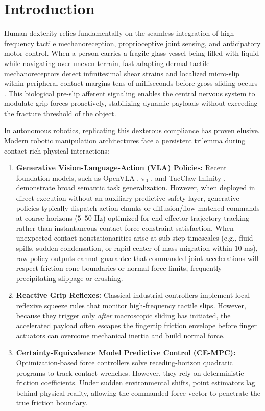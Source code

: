 \section{Introduction}
\label{sec:introduction}

Human dexterity relies fundamentally on the seamless integration of high-frequency tactile mechanoreception, proprioceptive joint sensing, and anticipatory motor control. When a person carries a fragile glass vessel being filled with liquid while navigating over uneven terrain, fast-adapting dermal tactile mechanoreceptors detect infinitesimal shear strains and localized micro-slip within peripheral contact margins tens of milliseconds before gross sliding occurs \cite{westling1984factors,johansson2009coding}. This biological pre-slip afferent signaling enables the central nervous system to modulate grip forces proactively, stabilizing dynamic payloads without exceeding the fracture threshold of the object.

In autonomous robotics, replicating this dexterous compliance has proven elusive. Modern robotic manipulation architectures face a persistent trilemma during contact-rich physical interactions:
\begin{enumerate}
    \item \textbf{Generative Vision-Language-Action (VLA) Policies:} Recent foundation models, such as OpenVLA \cite{openvla2024}, $\pi_0$ \cite{pi02024}, and TacClaw-Infinity \cite{tacclaw2026infinity}, demonstrate broad semantic task generalization. However, when deployed in direct execution without an auxiliary predictive safety layer, generative policies typically dispatch action chunks or diffusion/flow-matched commands at coarse horizons ($5\text{--}50\text{ Hz}$) optimized for end-effector trajectory tracking rather than instantaneous contact force constraint satisfaction. When unexpected contact nonstationarities arise at sub-step timescales (e.g., fluid spills, sudden condensation, or rapid center-of-mass migration within $10\text{ ms}$), raw policy outputs cannot guarantee that commanded joint accelerations will respect friction-cone boundaries or normal force limits, frequently precipitating slippage or crushing.
    \item \textbf{Reactive Grip Reflexes:} Classical industrial controllers implement local reflexive squeeze rules that monitor high-frequency tactile slips. However, because they trigger only \emph{after} macroscopic sliding has initiated, the accelerated payload often escapes the fingertip friction envelope before finger actuators can overcome mechanical inertia and build normal force.
    \item \textbf{Certainty-Equivalence Model Predictive Control (CE-MPC):} Optimization-based force controllers solve receding-horizon quadratic programs to track contact wrenches. However, they rely on deterministic friction coefficients. Under sudden environmental shifts, point estimators lag behind physical reality, allowing the commanded force vector to penetrate the true friction boundary.
\end{enumerate}

